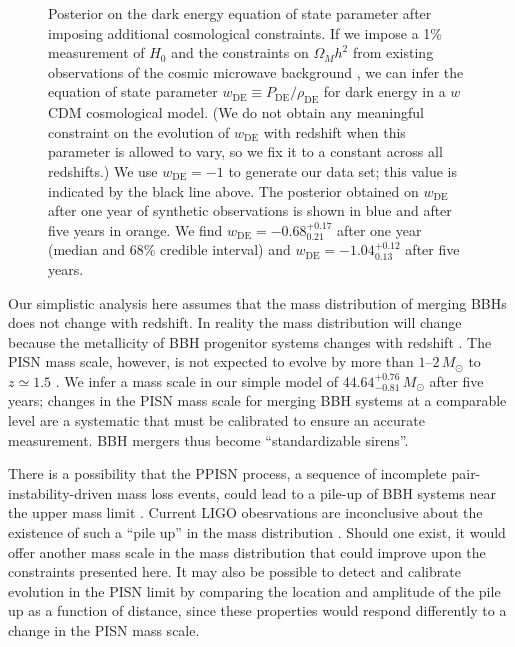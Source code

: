 \documentclass[modern]{aastex62}
\newcommand{\wDE}{w_\mathrm{DE}}
\newcommand{\MScaleFiveYear}{44.64^{+0.76}_{-0.81} \, \MSun{}}
\newcommand{\wDEOneYear}{-0.68^{+0.17}_{0.21}}
\newcommand{\wDEFiveYear}{-1.04^{+0.12}_{0.13}}
\newcommand{\MSun}{M_\odot}
\begin{document}
\begin{figure}
%
  \caption{\label{fig:wDE} Posterior on the dark energy equation of state
  parameter after imposing additional cosmological constraints.  If we impose a
  1\% measurement of $H_0$ \citep{Chen2017,Mortlock2018} and the constraints on
  $\Omega_M h^2$ from existing observations of the cosmic microwave background
  \citep{Planck2016}, we can infer the equation of state parameter $\wDE{}
  \equiv P_\mathrm{DE} / \rho_\mathrm{DE}$ for dark energy in a $w$CDM
  cosmological model.  (We do not obtain any meaningful constraint on the
  evolution of $\wDE{}$ with redshift when this parameter is allowed to vary, so
  we fix it to a constant across all redshifts.)  We use $\wDE{} = -1$ to
  generate our data set; this value is indicated by the black line above.  The
  posterior obtained on $\wDE{}$ after one year of synthetic observations is
  shown in blue and after five years in orange.  We find $\wDE{} =
  \wDEOneYear{}$ after one year (median and 68\% credible interval) and $\wDE{}
  = \wDEFiveYear{}$ after five years.}
%
\end{figure}

Our simplistic analysis here assumes that the mass distribution of merging
\acp{BBH} does not change with redshift.  In reality the mass distribution will
change because the metallicity of \ac{BBH} progenitor systems changes with
redshift \citep{Belczynski2016,Mapelli2017}.  The \ac{PISN} mass scale, however,
is not expected to evolve by more than $1$--$2\,\MSun{}$ to $z \simeq 1.5$
\citep{Belczynski2016,Mapelli2017}.  We infer a mass scale in our simple model
of $\MScaleFiveYear{}$ after five years; changes in the \ac{PISN} mass scale for
merging \ac{BBH} systems at a comparable level are a systematic that must be
calibrated to ensure an accurate measurement.  \ac{BBH} mergers thus become
``standardizable sirens''.

There is a possibility that the \ac{PPISN} process, a sequence of incomplete
pair-instability-driven mass loss events, could lead to a pile-up of \ac{BBH}
systems near the upper mass limit
\citep{Belczynski2016,Marchant2018,Talbot2018}.  Current LIGO obesrvations are
inconclusive about the existence of such a ``pile up'' in the mass distribution
\citep{O1O2Population}.  Should one exist, it would offer another mass scale in
the mass distribution that could improve upon the constraints presented here. It
may also be possible to detect and calibrate evolution in the \ac{PISN} limit by
comparing the location and amplitude of the pile up as a function of distance,
since these properties would respond differently to a change in the \ac{PISN}
mass scale.
\end{document}
